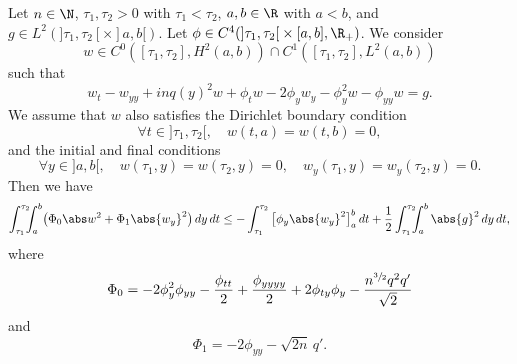 \begin{proposition} \label{prop-Carleman}
Let $n \in \N$, $\tau_1,\tau_2 > 0$ with $\tau_1<\tau_2$, $a,b \in \R$ with $a < b$, and $g \in L^2 (]\tau_1,\tau_2[\times{}]a,b[)$. Let $\phi \in C^4(]\tau_1,\tau_2[{}\times [a,b],\R_+)$. We consider
\[
w \in C^0([\tau_1,\tau_2],H^2(a,b)) \cap C^1([\tau_1,\tau_2],L^2(a,b))
\]
such that
\begin{equation} \label{eq-w}
w_t - w_{yy} + inq(y)^2 w + \phi_t w - 2 \phi_y w_y - \phi_y^2 w - \phi_{yy} w = g.
\end{equation}
We assume that $w$ also satisfies the Dirichlet boundary condition
\begin{equation} \label{eq-w-Dir}
\forall t \in{}]\tau_1,\tau_2[, \quad w(t,a) = w(t,b) = 0,
\end{equation}
and the initial and final conditions
\begin{equation} \label{eq-w-0T}
\forall y \in{}]a,b[, \quad w(\tau_1,y) = w(\tau_2,y) = 0, \quad w_y(\tau_1,y) = w_y(\tau_2,y) = 0.
\end{equation}
Then we have
\begin{equation*}
\int_{\tau_1}^{\tau_2} \hspace*{-2mm}\int_a^b \bigl(\Phi_0 \abs w^2 + \Phi_1 \abs{w_y}^2 \bigr) \, dy \, dt
\leq - \int_{\tau_1}^{\tau_2} \big[ \phi_y \abs{w_y}^2 \big]_a^b \, dt + \frac 1 2 \int_{\tau_1}^{\tau_2}\hspace*{-2mm} \int_a^b \abs{g}^2 \, dy \, dt ,
\end{equation*}
where
\begin{equation} \label{def-Phi0}
\Phi_0 = - 2 \phi_y^2 \phi_{yy} - \frac {\phi_{tt}}{2} + \frac {\phi_{yyyy}}{2} + 2\phi_{ty} \phi_{y} - \frac {n^{\sfrac{3}{2}}q^2 q'}{\sqrt 2}
\end{equation}
and
\begin{equation} \label{def-Phi1}
\Phi_1 = - 2 \phi_{yy} - \sqrt {2n}\, q'.
\end{equation}
\end{proposition}

